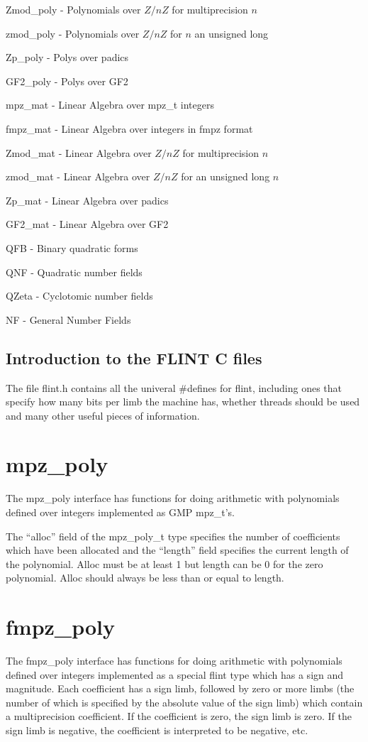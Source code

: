 \documentclass[a4paper,10pt]{article}
\begin{document}
Zmod\_poly - Polynomials over $Z/nZ$ for multiprecision $n$

zmod\_poly - Polynomials over $Z/nZ$ for $n$ an unsigned long

Zp\_poly - Polys over padics

GF2\_poly - Polys over GF2

\vspace{5mm}

mpz\_mat - Linear Algebra over mpz\_t integers

fmpz\_mat - Linear Algebra over integers in fmpz format

Zmod\_mat - Linear Algebra over $Z/nZ$ for multiprecision $n$

zmod\_mat - Linear Algebra over $Z/nZ$ for an unsigned long $n$

Zp\_mat - Linear Algebra over padics

GF2\_mat - Linear Algebra over GF2

\vspace{5mm}

QFB - Binary quadratic forms

QNF - Quadratic number fields

QZeta - Cyclotomic number fields

NF - General Number Fields

\subsection{Introduction to the FLINT C files}
The file flint.h contains all the univeral \#defines for flint, including ones that specify how many bits per limb the machine has, whether threads should be used and many other useful pieces of information.

\section{mpz\_poly}
The mpz\_poly interface has functions for doing arithmetic with polynomials defined over integers implemented as GMP mpz\_t's. 

The ``alloc'' field of the mpz\_poly\_t type specifies the number of coefficients which have been allocated and the ``length'' field specifies the current length of the polynomial. Alloc must be at least 1 but length can be 0 for the zero polynomial. Alloc should always be less than or equal to length.

\section{fmpz\_poly}
The fmpz\_poly interface has functions for doing arithmetic with polynomials defined over integers implemented as a special flint type which has a sign and magnitude. Each coefficient has a sign limb, followed by zero or more limbs (the number of which is specified by the absolute value of the sign limb) which contain a multiprecision coefficient. If the coefficient is zero, the sign limb is zero. If the sign limb is negative, the coefficient is interpreted to be negative, etc.
\end{document}
